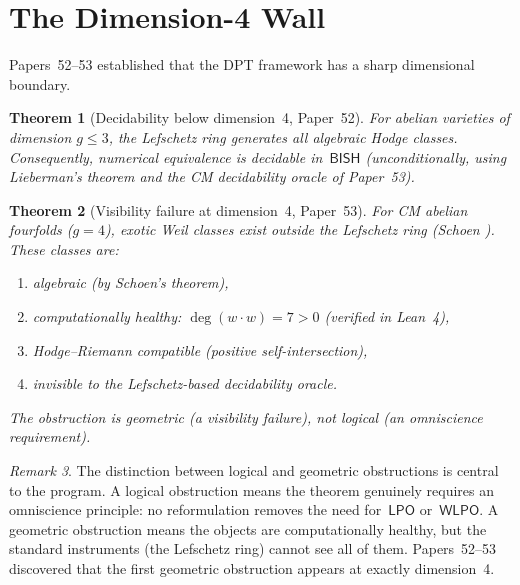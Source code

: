 \documentclass[11pt]{article}
\theoremstyle{plain}
\newtheorem{theorem}{Theorem}[section]
\theoremstyle{definition}
\theoremstyle{remark}
\newtheorem{remark}[theorem]{Remark}
\newcommand{\BISH}{\mathsf{BISH}}
\newcommand{\LPO}{\mathsf{LPO}}
\newcommand{\WLPO}{\mathsf{WLPO}}
\begin{document}
\section{The Dimension-4 Wall}\label{sec:wall}

Papers~52--53 \cite{Paper52, Paper53} established that the DPT
framework has a sharp dimensional boundary.

\begin{theorem}[Decidability below dimension~4,
  Paper~52]\label{thm:dim3}
For abelian varieties of dimension $g \le 3$, the Lefschetz ring
generates all algebraic Hodge classes.  Consequently,
numerical equivalence is decidable in~$\BISH$ (unconditionally,
using Lieberman's theorem and the CM decidability oracle of
Paper~53).
\end{theorem}

\begin{theorem}[Visibility failure at dimension~4,
  Paper~53]\label{thm:dim4}
For CM abelian fourfolds ($g = 4$), exotic Weil classes exist
outside the Lefschetz ring (Schoen \cite{Schoen1998}).  These
classes are:
\begin{enumerate}[label=(\roman*)]
\item algebraic (by Schoen's theorem),
\item computationally healthy: $\deg(w \cdot w) = 7 > 0$
  (verified in Lean~4),
\item Hodge--Riemann compatible (positive self-intersection),
\item \emph{invisible} to the Lefschetz-based decidability
  oracle.
\end{enumerate}
The obstruction is \emph{geometric} (a visibility failure), not
\emph{logical} (an omniscience requirement).
\end{theorem}

\begin{remark}
The distinction between logical and geometric obstructions is
central to the program.  A logical obstruction means the
theorem genuinely requires an omniscience principle: no
reformulation removes the need for~$\LPO$ or~$\WLPO$.  A
geometric obstruction means the objects are computationally
healthy, but the standard instruments (the Lefschetz ring)
cannot see all of them.  Papers~52--53 discovered that the
first geometric obstruction appears at exactly dimension~4.
\end{remark}
\end{document}
